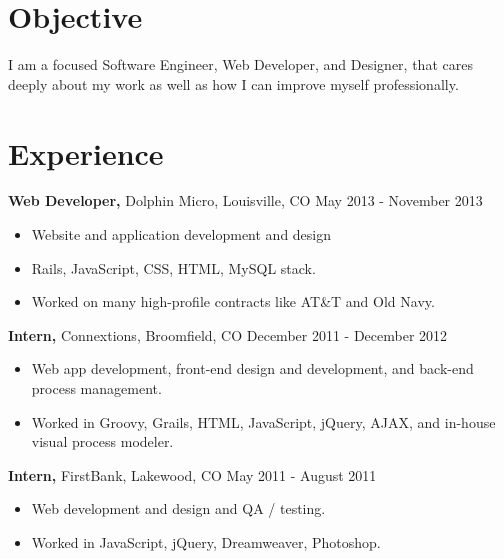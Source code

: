 \documentclass[margin]{res}
\begin{document}
 
 

\address{  mitchell.a.goudy@gmail.com \\ mitchellgoudy.com \\ (720) 480-7126 }

\address{ 2119 Spruce Street \#3 \\ Boulder, CO 80302 }

 
\begin{resume} 
 
\section{Objective} 
I am a focused Software Engineer, Web Developer, and Designer, that cares deeply about my work as well as how I can improve myself professionally. 

\section{Experience}
 {\bf Web Developer,} Dolphin Micro, Louisville, CO  \hfill May 2013 - November 2013
 \begin{itemize} \itemsep -2pt  %
 \item Website and application development and design
 \item Rails, JavaScript, CSS, HTML, MySQL stack. 
 \item Worked on many high-profile contracts like AT\&T and Old Navy.
 \end{itemize}

{\bf Intern,} Connextions, Broomfield, CO  \hfill December 2011 - December 2012
 \begin{itemize} \itemsep -2pt  %
 \item Web app development, front-end design and development, and back-end process management.
 \item Worked in Groovy, Grails, HTML, JavaScript, jQuery, AJAX, and in-house visual process modeler.
 \end{itemize}

 {\bf Intern,} FirstBank, Lakewood, CO  \hfill May 2011 - August 2011
 \begin{itemize} \itemsep -2pt  %
 \item Web development and design and QA / testing.
 \item Worked in JavaScript, jQuery, Dreamweaver, Photoshop.
 \end{itemize}


\end{resume}
\end{document}
